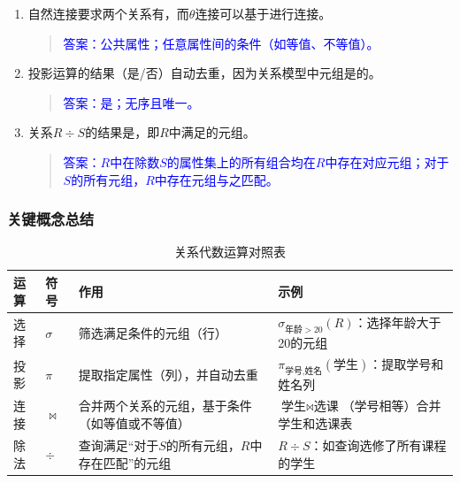 \documentclass[a4paper,12pt,UTF8,fontset=none]{ctexart}
\begin{document}
\begin{enumerate}[itemsep=1.2em]
    \item 自然连接要求两个关系有\underline{\hspace{3cm}}，而$\theta$连接可以基于\underline{\hspace{4cm}}进行连接。
    \begin{quote}
        \textcolor{blue}{答案：公共属性；任意属性间的条件（如等值、不等值）。}
    \end{quote}

    \item 投影运算的结果\underline{\hspace{1cm}}（是/否）自动去重，因为关系模型中元组是\underline{\hspace{2cm}}的。
    \begin{quote}
        \textcolor{blue}{答案：是；无序且唯一。}
    \end{quote}

    \item 关系$R \div S$的结果是\underline{\hspace{4cm}}，即$R$中满足\underline{\hspace{5cm}}的元组。
    \begin{quote}
        \textcolor{blue}{答案：$R$中在除数$S$的属性集上的所有组合均在$R$中存在对应元组；对于$S$的所有元组，$R$中存在元组与之匹配。}
    \end{quote}
\end{enumerate}

\subsubsection{关键概念总结}
\begin{table}[htbp]
    \centering
    \caption{关系代数运算对照表}
    \begin{tabular}{p{2.5cm}p{1.5cm}p{5cm}p{4.5cm}}
        \toprule
        \textbf{运算} & \textbf{符号} & \textbf{作用} & \textbf{示例} \\
        \midrule
        选择 & $\sigma$ & 筛选满足条件的元组（行） & $\sigma_{\text{年龄}>20}(R)$：选择年龄大于20的元组 \\
        投影 & $\pi$ & 提取指定属性（列），并自动去重 & $\pi_{\text{学号,姓名}}(\text{学生})$：提取学号和姓名列 \\
        连接 & $\Join$ & 合并两个关系的元组，基于条件（如等值或不等值） & $\text{学生} \Join \text{选课}$（学号相等）合并学生和选课表 \\
        除法 & $\div$ & 查询满足“对于$S$的所有元组，$R$中存在匹配”的元组 & $R \div S$：如查询选修了所有课程的学生 \\
        \bottomrule
    \end{tabular}
\end{table}
\end{document}
